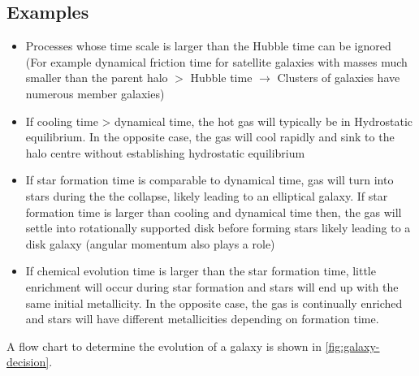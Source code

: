\subsection{Examples}
\begin{itemize}
	\item Processes whose time scale is larger than the Hubble time can be ignored (For example dynamical friction time for satellite galaxies with masses much smaller than the parent halo $>$ Hubble time $\rightarrow$ Clusters of galaxies have numerous member galaxies)
	\item If cooling time > dynamical time, the hot gas will typically be in Hydrostatic equilibrium. In the opposite case, the gas will cool rapidly and sink to the halo centre without establishing hydrostatic equilibrium
	\item If star formation time is comparable to dynamical time, gas will turn into stars during the the collapse, likely leading to an elliptical galaxy. If star formation time is larger than cooling and dynamical time then, the gas will settle into rotationally supported disk before forming stars likely leading to a disk galaxy (angular momentum also plays a role)
	\item If chemical evolution time is larger than the star formation time, little enrichment will occur during star formation and stars will end up with the same initial metallicity. In the opposite case, the gas is continually enriched and stars will have different metallicities depending on formation time.
\end{itemize}

A flow chart to determine the evolution of a galaxy is shown in \cref{fig:galaxy-decision}.


